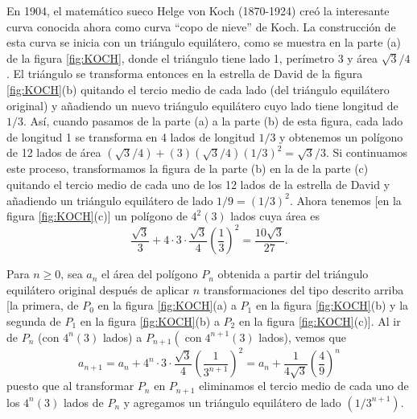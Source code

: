 \newpage

\begin{myexample}
    \begin{minipage}[l]{0.78\textwidth}
        En 1904, el matemático sueco Helge von Koch (1870-1924) creó la interesante curva conocida ahora como curva ``copo de nieve'' de Koch. La construcción de esta curva se inicia con un triángulo equilátero, como se muestra en la parte (a) de la figura \ref{fig:KOCH}, donde el triángulo tiene lado 1, perímetro 3 y área $\sqrt{3} / 4$. El triángulo se transforma entonces en la estrella de David de la figura \ref{fig:KOCH}(b) quitando el tercio medio de cada lado (del triángulo equilátero original) y añadiendo un nuevo triángulo equilátero cuyo lado tiene longitud de $1 / 3$. Así, cuando pasamos de la parte (a) a la parte (b) de esta figura, cada lado de longitud 1 se transforma en 4 lados de longitud $1 / 3$ y obtenemos un polígono de 12 lados de área $(\sqrt{3} / 4)+(3)(\sqrt{3} / 4)(1 / 3)^2=\sqrt{3} / 3$. Si continuamos este proceso, transformamos la figura de la parte (b) en la de la parte (c) quitando el tercio medio de cada uno de los 12 lados de la estrella de David y añadiendo un triángulo equilátero de lado $1 / 9 =(1 / 3)^2$. Ahora tenemos [en la figura \ref{fig:KOCH}(c)] un polígono de $4^2(3)$ lados cuya área es
        $$\frac{\sqrt{3}}{3} + 4 \cdot 3 \cdot \frac{\sqrt{3}}{4} \left(\frac{1}{3}\right)^2 = \frac{10\sqrt{3}}{27}.$$
        
        \hspace*{6mm}Para $n \geq 0$, sea $a_n$ el área del polígono $P_n$ obtenida a partir del triángulo equilátero original después de aplicar $n$ transformaciones del tipo descrito arriba [la primera, de $P_0$ en la figura \ref{fig:KOCH}(a) a $P_1$ en la figura \ref{fig:KOCH}(b) y la segunda de $P_1$ en la figura \ref{fig:KOCH}(b) a $P_2$ en la figura \ref{fig:KOCH}(c)]. Al ir de $P_n$ (con $4^n(3)$ lados) a $P_{n+1}\left(\operatorname{con} 4^{n+1}(3)\right.$ lados), vemos que
        \begin{equation}
            a_{n+1} = a_n + 4^n \cdot 3 \cdot \frac{\sqrt{3}}{4} \left(\frac{1}{3^{n+1}}\right)^2 = a_n + \frac{1}{4\sqrt{3}} \left(\frac{4}{9}\right)^n \label{JAKAKAKAKLAOPPQKKA}
        \end{equation}
        puesto que al transformar $P_n$ en $P_{n+1}$ eliminamos el tercio medio de cada uno de los $4^n(3)$ lados de $P_n$ y agregamos un triángulo equilátero de lado $\left(1 / 3^{n+1}\right)$.


\end{minipage}
\end{myexample}
